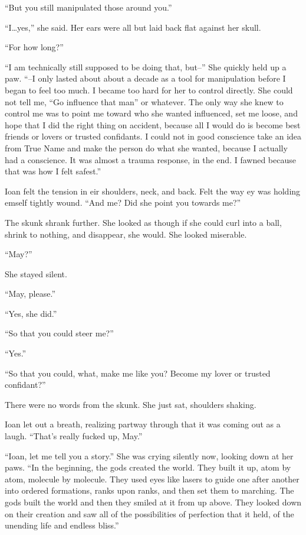 ``But you still manipulated those around you.''

``I\ldots yes,'' she said. Her ears were all but laid back flat against her skull.

``For how long?''

``I am technically still supposed to be doing that, but--'' She quickly held up a paw. ``--I only lasted about about a decade as a tool for manipulation before I began to feel too much. I became too hard for her to control directly. She could not tell me, ``Go influence that man'' or whatever. The only way she knew to control me was to point me toward who she wanted influenced, set me loose, and hope that I did the right thing on accident, because all I would do is become best friends or lovers or trusted confidants. I could not in good conscience take an idea from True Name and make the person do what she wanted, because I actually had a conscience. It was almost a trauma response, in the end. I fawned because that was how I felt safest.''

Ioan felt the tension in eir shoulders, neck, and back. Felt the way ey was holding emself tightly wound. ``And me? Did she point you towards me?''

The skunk shrank further. She looked as though if she could curl into a ball, shrink to nothing, and disappear, she would. She looked miserable.

``May?''

She stayed silent.

``May, please.''

``Yes, she did.''

``So that you could steer me?''

``Yes.''

``So that you could, what, make me like you? Become my lover or trusted confidant?''

There were no words from the skunk. She just sat, shoulders shaking.

Ioan let out a breath, realizing partway through that it was coming out as a laugh. ``That's really fucked up, May.''

``Ioan, let me tell you a story.'' She was crying silently now, looking down at her paws. ``In the beginning, the gods created the world. They built it up, atom by atom, molecule by molecule. They used eyes like lasers to guide one after another into ordered formations, ranks upon ranks, and then set them to marching. The gods built the world and then they smiled at it from up above. They looked down on their creation and saw all of the possibilities of perfection that it held, of the unending life and endless bliss.''

